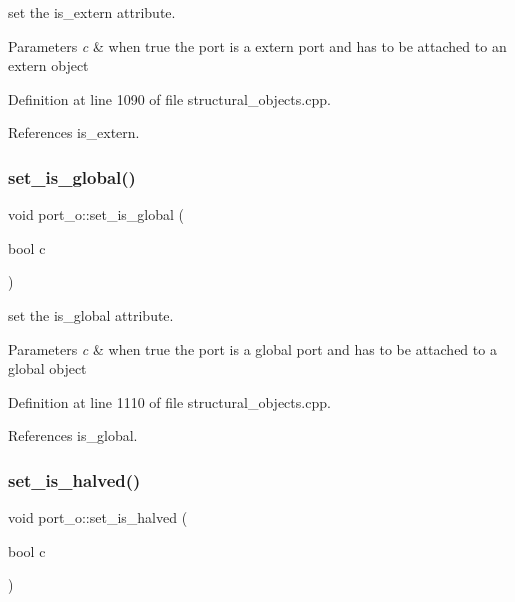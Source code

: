 set the is\+\_\+extern attribute. 


\begin{DoxyParams}{Parameters}
{\em c} & when true the port is a extern port and has to be attached to an extern object \\
\hline
\end{DoxyParams}


Definition at line 1090 of file structural\+\_\+objects.\+cpp.



References is\+\_\+extern.

\mbox{\label{structport__o_a4ede07d181467981977a7c051e8472ed}} 
\subsubsection{\texorpdfstring{set\+\_\+is\+\_\+global()}{set\_is\_global()}}
{\footnotesize\ttfamily void port\+\_\+o\+::set\+\_\+is\+\_\+global (\begin{DoxyParamCaption}\item[{bool}]{c }\end{DoxyParamCaption})}



set the is\+\_\+global attribute. 


\begin{DoxyParams}{Parameters}
{\em c} & when true the port is a global port and has to be attached to a global object \\
\hline
\end{DoxyParams}


Definition at line 1110 of file structural\+\_\+objects.\+cpp.



References is\+\_\+global.

\mbox{\label{structport__o_ac28608897ce69d6686aae9af437ce4b8}} 
\subsubsection{\texorpdfstring{set\+\_\+is\+\_\+halved()}{set\_is\_halved()}}
{\footnotesize\ttfamily void port\+\_\+o\+::set\+\_\+is\+\_\+halved (\begin{DoxyParamCaption}\item[{bool}]{c }\end{DoxyParamCaption})}



